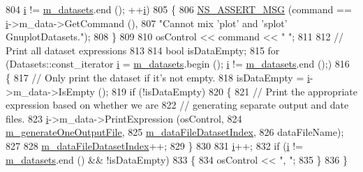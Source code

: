 \begin{DoxyCode}
804        \hyperlink{bernuolliDistribution_8m_a6f6ccfcf58b31cb6412107d9d5281426}{i} != \hyperlink{classns3_1_1Gnuplot_a67150d03c8735e79efa247e27ffd2ab5}{m\_datasets}.end (); ++\hyperlink{bernuolliDistribution_8m_a6f6ccfcf58b31cb6412107d9d5281426}{i})
805     \{
806       \hyperlink{assert_8h_aff5ece9066c74e681e74999856f08539}{NS\_ASSERT\_MSG} (command == \hyperlink{bernuolliDistribution_8m_a6f6ccfcf58b31cb6412107d9d5281426}{i}->m\_data->GetCommand (),
807                      \textcolor{stringliteral}{"Cannot mix 'plot' and 'splot' GnuplotDatasets."});
808     \}
809 
810   osControl << command << \textcolor{stringliteral}{" "};
811 
812   \textcolor{comment}{// Print all dataset expressions}
813 
814   \textcolor{keywordtype}{bool} isDataEmpty;
815   \textcolor{keywordflow}{for} (Datasets::const\_iterator \hyperlink{bernuolliDistribution_8m_a6f6ccfcf58b31cb6412107d9d5281426}{i} = \hyperlink{classns3_1_1Gnuplot_a67150d03c8735e79efa247e27ffd2ab5}{m\_datasets}.begin (); \hyperlink{bernuolliDistribution_8m_a6f6ccfcf58b31cb6412107d9d5281426}{i} != 
      \hyperlink{classns3_1_1Gnuplot_a67150d03c8735e79efa247e27ffd2ab5}{m\_datasets}.end ();)
816     \{
817       \textcolor{comment}{// Only print the dataset if it's not empty.}
818       isDataEmpty = \hyperlink{bernuolliDistribution_8m_a6f6ccfcf58b31cb6412107d9d5281426}{i}->m\_data->IsEmpty ();
819       \textcolor{keywordflow}{if} (!isDataEmpty)
820         \{
821           \textcolor{comment}{// Print the appropriate expression based on whether we are}
822           \textcolor{comment}{// generating separate output and date files.}
823           \hyperlink{bernuolliDistribution_8m_a6f6ccfcf58b31cb6412107d9d5281426}{i}->m\_data->PrintExpression (osControl,
824                                       \hyperlink{classns3_1_1Gnuplot_ad4412600f51935ec7e5d53223f255779}{m\_generateOneOutputFile},
825                                       \hyperlink{classns3_1_1Gnuplot_a630bfa2339c364f07c3892a6044ff80f}{m\_dataFileDatasetIndex},
826                                       dataFileName);
827     
828           \hyperlink{classns3_1_1Gnuplot_a630bfa2339c364f07c3892a6044ff80f}{m\_dataFileDatasetIndex}++;
829         \}
830 
831       \hyperlink{bernuolliDistribution_8m_a6f6ccfcf58b31cb6412107d9d5281426}{i}++;
832       \textcolor{keywordflow}{if} (\hyperlink{bernuolliDistribution_8m_a6f6ccfcf58b31cb6412107d9d5281426}{i} != \hyperlink{classns3_1_1Gnuplot_a67150d03c8735e79efa247e27ffd2ab5}{m\_datasets}.end () && !isDataEmpty)
833         \{
834           osControl << \textcolor{stringliteral}{", "};
835         \}
836     \}

\end{DoxyCode}
